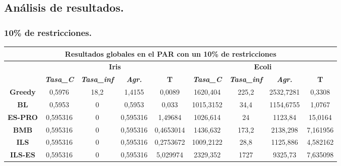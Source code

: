 \documentclass[12pt, spanish]{article}
\begin{document}
\subsection{Análisis de resultados.	}

\subsubsection{10\% de restricciones.}

\begin{table}[H]
\begin{tabular}{|c|c|c|c|c|c|c|c|c|}
\hline
\multicolumn{9}{|c|}{\textbf{Resultados globales en el PAR con un 10\% de restricciones}}                                                                                                                      \\ \hline
\multicolumn{1}{|l|}{\multirow{2}{*}{}} & \multicolumn{4}{c|}{\textbf{Iris}}                                                            & \multicolumn{4}{c|}{\textbf{Ecoli}}                                                           \\ \cline{2-9} 
\multicolumn{1}{|l|}{}                  & \textit{\textbf{Tasa\_C}} & \textit{\textbf{Tasa\_inf}} & \textit{\textbf{Agr.}} & \textbf{T} & \textit{\textbf{Tasa\_C}} & \textit{\textbf{Tasa\_inf}} & \textit{\textbf{Agr.}} & \textbf{T} \\ \hline
\textbf{Greedy}                         & 0,5976                    & 18,2                        & 1,4155                 & 0,0089     & 1620,404                  & 225,2                       & 2532,7281              & 0,3308     \\ \hline
\textbf{BL}                             & 0,5953                    & 0                           & 0,5953                 & 0,033      & 1015,3152                 & 34,4                        & 1154,6755              & 1,0767     \\ \hline
\textbf{ES-PRO}                & 0,595316                  & 0                           & 0,595316               & 1,49684    & 1026,614                  & 24                          & 1123,84                & 15,0164    \\ \hline
\textbf{BMB}                            & 0,595316                  & 0                           & 0,595316               & 0,4653014  & 1436,632                  & 173,2                       & 2138,298               & 7,161956   \\ \hline
\textbf{ILS}                            & 0,595316                  & 0                           & 0,595316               & 0,2753672  & 1009,2122                 & 28,8                        & 1125,886               & 4,582162   \\ \hline
\textbf{ILS-ES}                         & 0,595316                  & 0                           & 0,595316               & 5,029974   & 2329,352                  & 1727                        & 9325,73                & 7,635098   \\ \hline
\end{tabular}
\end{table}
\end{document}
